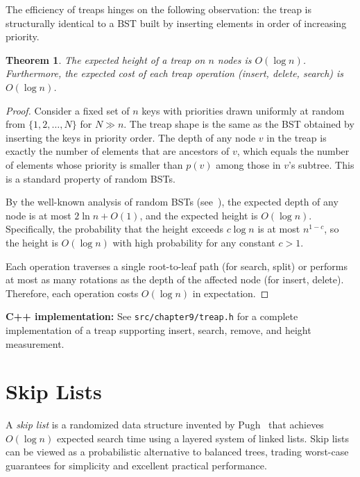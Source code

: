 \documentclass[twoside,12pt]{book}
\theoremstyle{plain}
\newtheorem{theorem}{Theorem}[chapter]
\theoremstyle{definition}
\theoremstyle{remark}
\newenvironment{cpplisting}{\begin{center}\small}{\end{center}}
\begin{document}
The efficiency of treaps hinges on the following observation: the treap is structurally identical to a BST built by inserting elements in order of increasing priority.

\begin{theorem}\label{thm:treap}
The expected height of a treap on $n$ nodes is $O(\log n)$. Furthermore, the expected cost of each treap operation (insert, delete, search) is $O(\log n)$.
\end{theorem}

\begin{proof}
Consider a fixed set of $n$ keys with priorities drawn uniformly at random from $\{1, 2, \ldots, N\}$ for $N \gg n$. The treap shape is the same as the BST obtained by inserting the keys in priority order. The depth of any node $v$ in the treap is exactly the number of elements that are ancestors of $v$, which equals the number of elements whose priority is smaller than $p(v)$ among those in $v$'s subtree. This is a standard property of random BSTs.

By the well-known analysis of random BSTs (see~\cite{devroye1988}), the expected depth of any node is at most $2 \ln n + O(1)$, and the expected height is $O(\log n)$. Specifically, the probability that the height exceeds $c \log n$ is at most $n^{1-c}$, so the height is $O(\log n)$ with high probability for any constant $c > 1$.

Each operation traverses a single root-to-leaf path (for search, split) or performs at most as many rotations as the depth of the affected node (for insert, delete). Therefore, each operation costs $O(\log n)$ in expectation.
\end{proof}

\begin{cpplisting}
\textbf{C++ implementation:} See \texttt{src/chapter9/treap.h} for a complete implementation
of a treap supporting insert, search, remove, and height measurement.
\end{cpplisting}

\section{Skip Lists}
\label{sec:skip-lists}

A \emph{skip list} is a randomized data structure invented by Pugh~\cite{pugh1990} that achieves $O(\log n)$ expected search time using a layered system of linked lists. Skip lists can be viewed as a probabilistic alternative to balanced trees, trading worst-case guarantees for simplicity and excellent practical performance.
\end{document}
